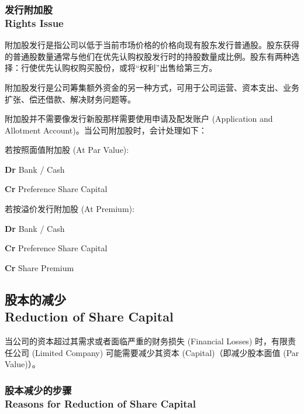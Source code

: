\documentclass{article}
\begin{document}
    \subsubsection{发行附加股\\Rights Issue}

    \noindent 附加股发行是指公司以低于当前市场价格的价格向现有股东发行普通股。股东获得的普通股数量通常与他们在优先认购权股发行时的持股数量成比例。股东有两种选择：行使优先认购权购买股份，或将“权利”出售给第三方。

    附加股发行是公司筹集额外资金的另一种方式，可用于公司运营、资本支出、业务扩张、偿还借款、解决财务问题等。

    附加股并不需要像发行新股那样需要使用申请及配发账户 (Application and Allotment Account)。当公司附加股时，会计处理如下：

    \newpage
    若按照面值附加股 (At Par Value):
    \begin{mdframed}[backgroundcolor=gray!10]
    \textbf{Dr} Bank / Cash

    \noindent \hspace{1.7em}\textbf{Cr} Preference Share Capital
    \end{mdframed}

    若按溢价发行附加股 (At Premium):
    \begin{mdframed}[backgroundcolor=gray!10]
    \textbf{Dr} Bank / Cash

    \noindent \hspace{1.7em}\textbf{Cr} Preference Share Capital

    \noindent \hspace{1.7em}\textbf{Cr} Share Premium
    \end{mdframed}

\subsection{股本的减少\\Reduction of Share Capital}

\noindent 当公司的资本超过其需求或者面临严重的财务损失 (Financial Losses) 时，有限责任公司 (Limited Company) 可能需要减少其资本 (Capital)（即减少股本面值 (Par Value)）。

\subsubsection{股本减少的步骤\\Reasons for Reduction of Share Capital}
\end{document}

